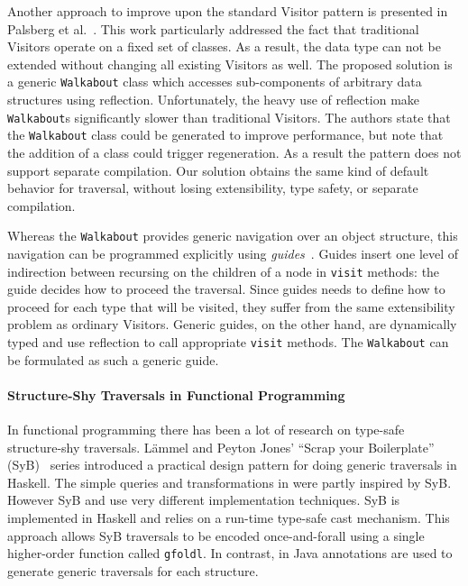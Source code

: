 Another approach to improve upon the standard Visitor pattern is presented in Palsberg et al.~\cite{palsberg98essence}.
This work particularly addressed the fact that traditional Visitors operate on a fixed set of classes. As a result, the data type can not be extended without changing all existing Visitors as well.
The proposed solution is a generic \lstinline{Walkabout} class which accesses sub-components of arbitrary data structures using reflection.
Unfortunately, the heavy use of reflection make \lstinline{Walkabout}s significantly slower than traditional Visitors.
The authors  state that the \lstinline{Walkabout} class could be generated to improve performance, but note that the addition of a class could trigger regeneration. As a result the pattern does not support separate compilation.
Our solution obtains the same kind of default behavior for traversal,  without losing extensibility, type safety, or separate compilation.

Whereas the \lstinline{Walkabout} provides generic navigation over an object structure, this navigation can be programmed explicitly using \textit{guides}~\cite{bravenboer2001guiding}.
Guides insert one level of indirection between recursing on the children of a node in \lstinline{visit} methods: the guide decides how to proceed the traversal.
Since guides needs to define how to proceed for each type that will be visited, they suffer from the same extensibility problem
as ordinary Visitors.
Generic guides, on the other hand, are dynamically typed and use reflection to call appropriate \lstinline{visit} methods.
The \lstinline{Walkabout} can be formulated as such a generic guide.





\paragraph{Structure-Shy Traversals in Functional Programming}
In
functional programming there has been a lot of research on type-safe
structure-shy traversals. L\"ammel and Peyton Jones' ``Scrap your
Boilerplate'' (SyB)~\cite{ralf03syb,lammel04syb,lammel05syb} series
introduced a practical design pattern for doing generic
traversals in Haskell. The simple queries and transformations in
\name were partly inspired by SyB. However SyB and \name use very
different implementation techniques. SyB is implemented in Haskell and
relies on a run-time type-safe cast mechanism. This approach allows
SyB traversals to be encoded once-and-forall using a single
higher-order function called {\small\texttt{gfoldl}}.
In contrast, in \name
Java annotations are used to generate generic traversals for each
structure.

